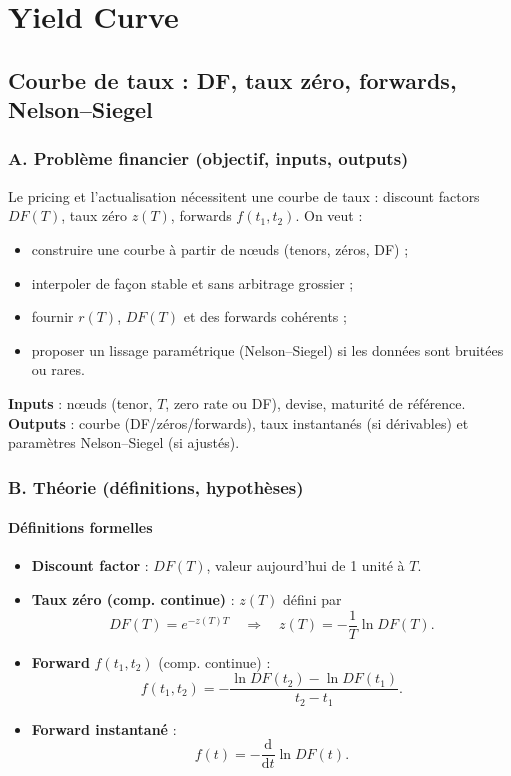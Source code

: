 \documentclass[11pt,a4paper]{report}
\theoremstyle{definition}
\theoremstyle{plain}
\theoremstyle{remark}
\newcommand{\dd}{\mathrm{d}}
\newcommand{\1}{\mathbf{1}}
\begin{document}
\part{Yield Curve}

\chapter{Courbe de taux : DF, taux zéro, forwards, Nelson--Siegel}

\section{A. Problème financier (objectif, inputs, outputs)}
Le pricing et l'actualisation nécessitent une courbe de taux : discount factors $DF(T)$, taux zéro $z(T)$, forwards $f(t_1,t_2)$. On veut :
\begin{itemize}[leftmargin=*]
\item construire une courbe à partir de n\oe{}uds (tenors, zéros, DF) ;
\item interpoler de façon stable et sans arbitrage grossier ;
\item fournir $r(T)$, $DF(T)$ et des forwards cohérents ;
\item proposer un lissage paramétrique (Nelson--Siegel) si les données sont bruitées ou rares.
\end{itemize}

\textbf{Inputs} : n\oe{}uds (tenor, $T$, zero rate ou DF), devise, maturité de référence.
\textbf{Outputs} : courbe (DF/zéros/forwards), taux instantanés (si dérivables) et paramètres Nelson--Siegel (si ajustés).

\section{B. Théorie (définitions, hypothèses)}
\subsection*{Définitions formelles}
\begin{itemize}[leftmargin=*]
\item \textbf{Discount factor} : $DF(T)$, valeur aujourd'hui de 1 unité à $T$.
\item \textbf{Taux zéro (comp. continue)} : $z(T)$ défini par
\[
DF(T)=e^{-z(T)T}\quad\Rightarrow\quad z(T)=-\frac{1}{T}\ln DF(T).
\]
\item \textbf{Forward} $f(t_1,t_2)$ (comp. continue) :
\[
f(t_1,t_2)=-\frac{\ln DF(t_2)-\ln DF(t_1)}{t_2-t_1}.
\]
\item \textbf{Forward instantané} :
\[
f(t)=-\frac{\dd}{\dd t}\ln DF(t).
\]
\end{itemize}
\end{document}
